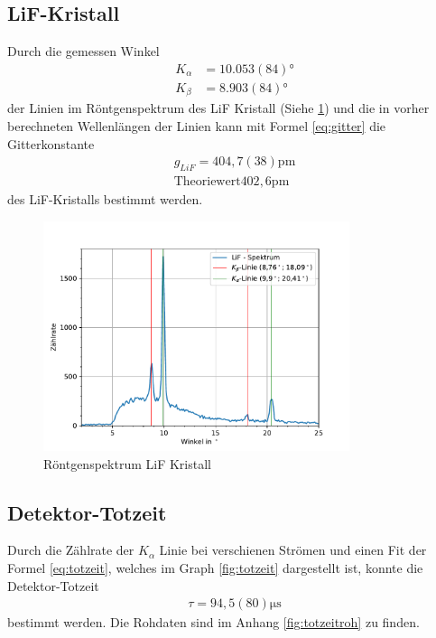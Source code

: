 \documentclass[11pt, a4paper]{article}
\begin{document}
    \subsection{LiF-Kristall}
    Durch die gemessen Winkel
    \begin{align}
        K_{\alpha} &= 10.053(84) \si{\degree} \\
        K_{\beta} &= 8.903(84) \si{\degree}
    \end{align}
    der Linien im Röntgenspektrum des LiF Kristall (Siehe \ref{fig:LiF}) und die in vorher berechneten Wellenlängen der Linien kann mit Formel \ref{eq:gitter} die Gitterkonstante
    \begin{align}
        g_{LiF} = 404,7(38) \si{\pico\meter} \\
        \text{Theoriewert} 402,6 \si{\pico\meter}
    \end{align}
    des LiF-Kristalls bestimmt werden.

    \begin{figure}
        \centering
        \includegraphics[width=0.8\textwidth]{LiF-Spektrum.pdf}
        \caption{Röntgenspektrum LiF Kristall}
        \label{fig:LiF}
    \end{figure}

    \subsection{Detektor-Totzeit}
    Durch die Zählrate der $K_{\alpha}$ Linie bei verschienen Strömen und einen Fit der Formel \ref{eq:totzeit}, welches im Graph \ref{fig:totzeit} dargestellt ist, konnte die Detektor-Totzeit
    \begin{align}
        \tau = 94,5(80) \si{\micro\second}
    \end{align}
    bestimmt werden. Die Rohdaten sind im Anhang \ref{fig:totzeitroh} zu finden.
\end{document}
